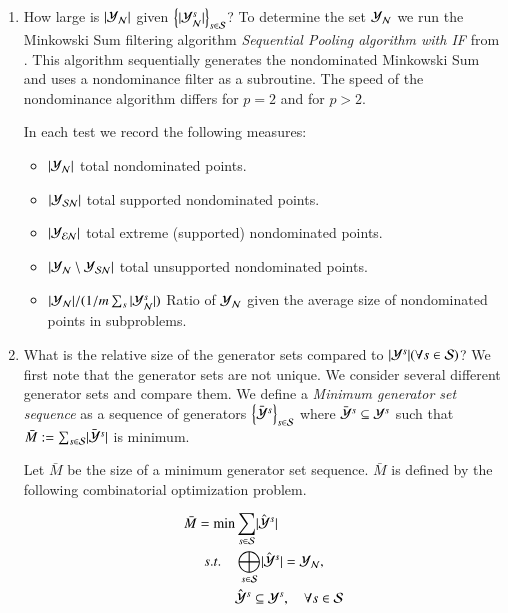 \begin{enumerate}
	\item  How large is $\lvert \mathcal{Y}_{\mathcal{N}} \rvert$ given $\left\{\lvert \mathcal{Y}_{\mathcal{N}}^s \rvert \right\}_{s \in \mathcal{S}}$?
To determine the set $\mathcal{Y}_{\mathcal{N}}$ we run the Minkowski Sum filtering algorithm \emph{Sequential Pooling algorithm with IF} from \citep[Algorithm 1]{Kerberenes2022}. This algorithm sequentially generates the nondominated Minkowski Sum and uses a nondominance filter as a subroutine. The speed of the nondominance algorithm differs for $p=2$ and for $p>2$.

In each test we record the following measures:
\begin{itemize}
	\item 
$\lvert \mathcal{Y}_{\mathcal{N}} \rvert$ total nondominated points.
	\item 
$\lvert \mathcal{Y}_{\mathcal{SN}} \rvert$ total supported nondominated points.
	\item 
$\lvert \mathcal{Y}_{\mathcal{EN}} \rvert$ total extreme (supported) nondominated points.
	\item 
$\lvert \mathcal{Y}_{\mathcal{N}} \setminus \mathcal{Y}_{\mathcal{SN}} \rvert$ total unsupported nondominated points.
	\item 
$|\mathcal{Y}_{\mathcal{N}}| /  (1/m\sum_s |\mathcal{Y}_{\mathcal{N}}^s|)$ Ratio of $\mathcal{Y}_{\mathcal{N}}$ given the average size of nondominated points in subproblems.
\end{itemize}



\item What is the relative size of the generator sets compared to $\lvert \mathcal{Y}^s \rvert (\forall s \in \mathcal{S})$?
We first note that the generator sets are not unique. We consider several different generator sets and compare them. We define a \emph{Minimum generator set sequence} as a sequence of generators $\left\{ \bar{\mathcal{Y}}^{s}  \right\}_{s \in \mathcal{S}}$ where $\bar{\mathcal{Y}}^{s} \subseteq \mathcal{Y}^s$ such that $\bar{M} := \sum_{s \in \mathcal{S}} \lvert \bar{\mathcal{Y}}^{s} \rvert$ is minimum.

Let $\bar{M}$ be the size of a minimum generator set sequence. $\bar{M}$ is defined by the following combinatorial optimization problem.

\begin{align}
	\bar{M}  =  \min& \sum_{s \in \mathcal{S}} \lvert \hat{\mathcal{Y}}^s \rvert  \\
	s.t. \quad & \bigoplus_{s \in \mathcal{S}} \lvert \hat{\mathcal{Y}}^s \rvert = \mathcal{Y}_{\mathcal{N}},  \label{constr:comb spanning}\\
		   & \hat{\mathcal{Y}}^s \subseteq \mathcal{Y}^s, \quad \forall s \in \mathcal{S}
\end{align}


\end{enumerate}
